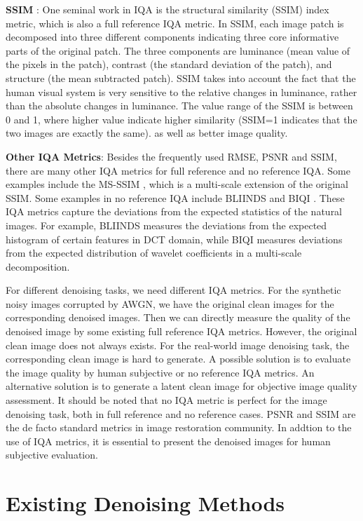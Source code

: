 \textbf{SSIM} \cite{ssim}: One seminal work in IQA is the structural similarity (SSIM) index metric, which is also a full reference IQA metric. In SSIM, each image patch is decomposed into three different components indicating three core informative parts of the original patch. The three components are luminance (mean value of the pixels in the patch), contrast (the standard deviation of the patch), and structure (the mean subtracted patch). SSIM takes into account the fact that the human visual system is very sensitive to the relative changes in luminance, rather than the absolute changes in luminance. The value range of the SSIM is between 0 and 1, where higher value indicate higher similarity (SSIM=1 indicates that the two images are exactly the same). as well as better image quality. 

\textbf{Other IQA Metrics}: Besides the frequently used RMSE, PSNR and SSIM, there are many other IQA metrics for full reference and no reference IQA. Some examples include the MS-SSIM \cite{msssim}, which is a multi-scale extension of the original SSIM. Some examples in no reference IQA include BLIINDS \cite{bliinds} and BIQI \cite{biqi}. These IQA metrics capture the deviations from the expected statistics of the natural images. For example, BLIINDS measures the deviations from the expected histogram of certain features in DCT domain, while BIQI measures deviations from the expected distribution of wavelet coefficients in a multi-scale decomposition.

For different denoising tasks, we need different IQA metrics. For the synthetic noisy images corrupted by AWGN, we have the original clean images for the corresponding denoised images. Then we can directly measure the quality of the denoised image by some existing full reference IQA metrics. However, the original clean image does not always exists. For the real-world image denoising task, the corresponding clean image is hard to generate. A possible solution is to evaluate the image quality by human subjective or no reference IQA metrics. An alternative solution is to generate a latent clean image for objective image quality assessment. It should be noted that no IQA metric is perfect for the image denoising task, both in full reference and no reference cases. PSNR and SSIM are the de facto standard metrics in image restoration community. In addtion to the use of IQA metrics, it is essential to present the denoised images for human subjective evaluation.


\section{Existing Denoising Methods}

